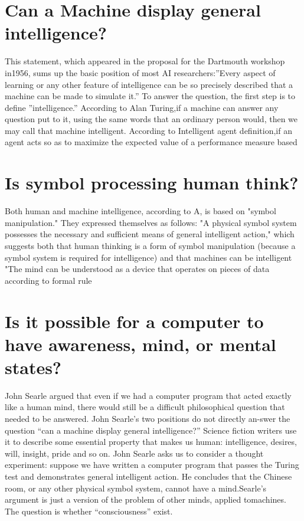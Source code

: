 \documentclass[a4paper,10pt]{article}
\begin{document}
\section{ Can a Machine display general intelligence?}
This statement, which appeared in the proposal for the Dartmouth workshop in1956, sums up the basic position of most AI researchers:”Every aspect of learning or any other feature of intelligence can be so precisely described that a machine can be made to simulate it.” To answer the question, the first step is to define ”intelligence.” According to Alan Turing,if a machine can answer any question put to it, using the same words that an ordinary person would, then we may call that machine intelligent. According to Intelligent agent definition,if an agent acts so as to maximize the expected value of a performance measure based 
\section{Is symbol processing human think?}
Both human and machine intelligence, according to A, is based on "symbol
manipulation." They expressed themselves as follows:
"A physical symbol system possesses the necessary and sufficient means of general intelligent action," which suggests both that human thinking is a form of symbol
manipulation (because a symbol system is required for intelligence) and that machines can be intelligent
 "The mind can be understood as a device that operates on pieces of data according to formal rule

\section {Is it possible for a computer to have awareness, mind, or mental states?}
John Searle argued that even if we had a computer program that acted exactly like a human mind, there would still be a difficult philosophical question that needed to be answered. John Searle’s two positions do not directly an-swer the question “can a machine display general intelligence?” Science fiction writers use it to describe some essential property that makes us human: intelligence, desires, will, insight, pride and so on. John Searle asks us to consider a
thought experiment: suppose we have written a computer program that passes the Turing test and demonstrates general intelligent action. He concludes that the Chinese room, or any other physical symbol system, cannot have a mind.Searle’s argument is just a version of the problem of other minds, applied
tomachines. The question is whether “consciousness” exist.
\end{document}
